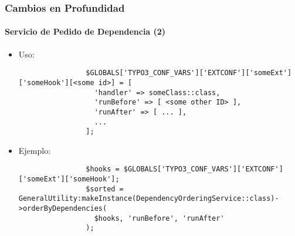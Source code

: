 \begin{frame}[fragile]
	\frametitle{Cambios en Profundidad}
	\framesubtitle{Servicio de Pedido de Dependencia (2)}

	\lstset{basicstyle=\tiny\ttfamily}

	\begin{itemize}

		\item Uso:

			\begin{lstlisting}
				$GLOBALS['TYPO3_CONF_VARS']['EXTCONF']['someExt']['someHook'][<some id>] = [
				  'handler' => someClass::class,
				  'runBefore' => [ <some other ID> ],
				  'runAfter' => [ ... ],
				  ...
				];
			\end{lstlisting}

		\item Ejemplo:

			\begin{lstlisting}
				$hooks = $GLOBALS['TYPO3_CONF_VARS']['EXTCONF']['someExt']['someHook'];
				$sorted = GeneralUtility:makeInstance(DependencyOrderingService::class)->orderByDependencies(
				  $hooks, 'runBefore', 'runAfter'
				);
			\end{lstlisting}

	\end{itemize}

\end{frame}


